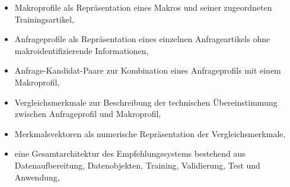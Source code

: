 \begin{itemize} 
    \item Makroprofile als Repräsentation eines Makros und seiner zugeordneten Trainingsartikel, 
    \item Anfrageprofile als Repräsentation eines einzelnen Anfrageartikels ohne makroidentifizierende Informationen, 
    \item Anfrage-Kandidat-Paare zur Kombination eines Anfrageprofils mit einem Makroprofil, 
    \item Vergleichsmerkmale zur Beschreibung der technischen Übereinstimmung zwischen Anfrageprofil und Makroprofil, 
    \item Merkmalsvektoren als numerische Repräsentation der Vergleichsmerkmale, 
    \item eine Gesamtarchitektur des Empfehlungssystems bestehend aus Datenaufbereitung, Datenobjekten, Training, Validierung, Test und Anwendung, 
\end{itemize}

